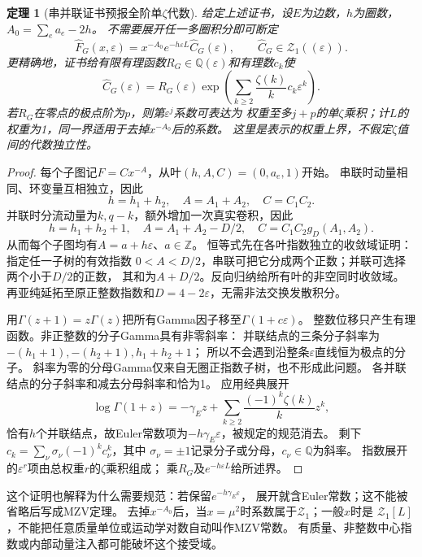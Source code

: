 \documentclass[11pt,a4paper]{ctexart}
\theoremstyle{cnplain}\newtheorem{theorem}{定理}[section]
\theoremstyle{definition}\newtheorem{definition}[theorem]{定义}
\theoremstyle{remark}\newtheorem{remark}[theorem]{注}
\begin{document}
\begin{theorem}[串并联证书预报全阶单$\zeta$代数]\label{thm:masslesssp}
给定上述证书，设$E$为边数，$h$为圈数，$A_0=\sum_e a_e-2h$。
不需要展开任一多圈积分即可断定
\[
 \widehat F_G(x,\varepsilon)
 =x^{-A_0}e^{-h\varepsilon L}\widehat C_G(\varepsilon),
 \qquad \widehat C_G\in\mathcal Z_1((\varepsilon)).
 \label{eq:masslessspclass}
\]
更精确地，证书给有限有理函数$R_G\in\mathbb Q(\varepsilon)$和有理数$c_k$使
\[
 \widehat C_G(\varepsilon)=R_G(\varepsilon)
 \exp\left(\sum_{k\ge2}\frac{\zeta(k)}k c_k\varepsilon^k\right).
 \label{eq:masslessgammaexp}
\]
若$R_G$在零点的极点阶为$p$，则第$\varepsilon^j$系数可表达为
权重至多$j+p$的单$\zeta$乘积；计$L$的权重为1，同一界适用于去掉$x^{-A_0}$后的系数。
这里是表示的权重上界，不假定$\zeta$值间的代数独立性。
\end{theorem}
\begin{proof}
每个子图记$F=Cx^{-A}$，从叶$(h,A,C)=(0,a_e,1)$开始。
串联时动量相同、环变量互相独立，因此
\[
 h=h_1+h_2,\quad A=A_1+A_2,\quad C=C_1C_2.
\]
并联时分流动量为$k,q-k$，额外增加一次真实卷积，因此
\[
 h=h_1+h_2+1,\quad A=A_1+A_2-D/2,\quad
 C=C_1C_2g_D(A_1,A_2).
\]
从而每个子图均有$A=a+h\varepsilon$、$a\in\mathbb Z$。
恒等式先在各叶指数独立的收敛域证明：指定任一子树的有效指数
$0<A<D/2$，串联可把它分成两个正数；并联可选择两个小于$D/2$的正数，
其和为$A+D/2$。反向归纳给所有叶的非空同时收敛域。
再亚纯延拓至原正整数指数和$D=4-2\varepsilon$，无需非法交换发散积分。

用$\Gamma(z+1)=z\Gamma(z)$把所有Gamma因子移至$\Gamma(1+c\varepsilon)$。
整数位移只产生有理函数。非正整数的分子Gamma具有非零斜率：
并联结点的三条分子斜率为$-(h_1+1),-(h_2+1),h_1+h_2+1$；
所以不会遇到沿整条$\varepsilon$直线恒为极点的分子。
斜率为零的分母Gamma仅来自无圈正指数子树，也不形成此问题。
各并联结点的分子斜率和减去分母斜率和恰为1。
应用经典展开\cite[5.7.3]{DLMFGamma}
\[
 \log\Gamma(1+z)=-\gamma_E z+
 \sum_{k\ge2}\frac{(-1)^k\zeta(k)}k z^k,
\]
恰有$h$个并联结点，故Euler常数项为$-h\gamma_E\varepsilon$，被规定的规范消去。
剩下$c_k=\sum_\nu\sigma_\nu(-1)^kc_\nu^k$，其中
$\sigma_\nu=\pm1$记录分子或分母，$c_\nu\in\mathbb Q$为斜率。
指数展开的$\varepsilon^r$项由总权重$r$的$\zeta$乘积组成；
乘$R_G$及$e^{-h\varepsilon L}$给所述界。
\end{proof}

这个证明也解释为什么需要规范：若保留$e^{-h\gamma_E\varepsilon}$，
展开就含Euler常数；这不能被省略后写成MZV定理。
去掉$x^{-A_0}$后，当$x=\mu^2$时系数属于$\mathcal Z_1$；一般$x$时是
$\mathcal Z_1[L]$，不能把任意质量单位或运动学对数自动叫作MZV常数。
有质量、非整数中心指数或内部动量注入都可能破坏这个接受域。
\end{document}
